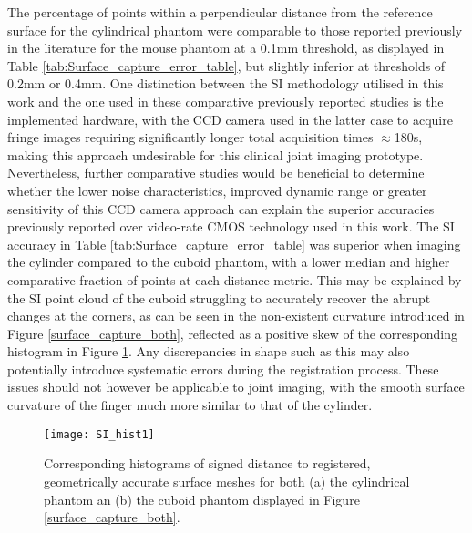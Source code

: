 \documentclass[twoside]{bhamthesis}
\theoremstyle{definition}
\begin{document}
The percentage of points within a perpendicular distance from the reference surface for the cylindrical phantom were comparable to those reported previously in the literature for the mouse phantom at a 0.1mm threshold, as displayed in Table \ref{tab:Surface_capture_error_table}, but slightly inferior at thresholds of 0.2mm or 0.4mm. One distinction between the SI methodology utilised in this work and the one used in these comparative previously reported studies is the implemented hardware, with the CCD camera used in the latter case to acquire fringe images requiring significantly longer total acquisition times $\approx$180s, making this approach undesirable for this clinical joint imaging prototype. Nevertheless, further comparative studies would be beneficial to determine whether the lower noise characteristics, improved dynamic range or greater sensitivity of this CCD camera approach can explain the superior accuracies previously reported over video-rate CMOS technology used in this work. The SI accuracy in Table \ref{tab:Surface_capture_error_table} was superior when imaging the cylinder compared to the cuboid phantom, with a lower median and higher comparative fraction of points at each distance metric. This may be explained by the SI point cloud of the cuboid struggling to accurately recover the abrupt changes at the corners, as can be seen in the non-existent curvature introduced in Figure \ref{surface_capture_both}, reflected as a positive skew of the corresponding histogram in Figure \ref{histograms}. Any discrepancies in shape such as this may also potentially introduce systematic errors during the registration process. These issues should not however be applicable to joint imaging, with the smooth surface curvature of the finger much more similar to that of the cylinder.

\begin{figure}[!ht]
\texttt{[image: SI\_hist1]}
\centering
\caption{Corresponding histograms of signed distance to registered, geometrically accurate surface meshes for both (a) the cylindrical phantom an (b) the cuboid phantom displayed in Figure \ref{surface_capture_both}.}
\centering
\label{histograms}
\end{figure}


\end{document}
